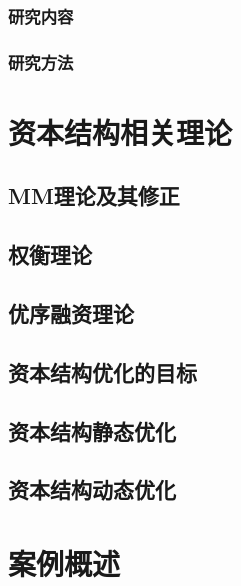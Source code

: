 \subsection{研究内容}
\subsection{研究方法}
\cite{Brusov2023}
\cite{Cao2018}
\cite{Chen2022}
\cite{Dai2022}
\cite{Dong2019}
\cite{Du2016}
\cite{Gu2022}
\cite{Hong2015}
\cite{Li2019}
\cite{Li2019a}
\cite{Li2021}
\cite{Li2023}
\cite{Liaqat2021}
\cite{Liu2017}
\cite{Liu2019}
\cite{Liu2022}
\cite{Liu2023}


\cite{Ma2022}
\cite{Mbulawa2020}
\cite{Meng2020}
\cite{Modigliani1958}
\cite{Shen2022}
\cite{Song2021}
\cite{Spitsin2020}
\cite{Su2022}
\cite{Sun2020}
\cite{Wan2022}
\cite{Wang2008}
\cite{Wang2021}
\cite{Wangchen2022}
\cite{Xiong2022}
\cite{Xu2022}
\cite{Xu2022a}
\cite{Yang2014}
\cite{Yang2020}
\cite{Yao2022}
\cite{Yu2017}
\cite{Zhang2014}
\cite{Zhang2022}
\cite{Zhang2022a}
\cite{Zhu2022}
\cite{Zhu2023}
\cite{Zuo2020}
\chapter{资本结构相关理论}

\section{MM理论及其修正}
\section{权衡理论}
\section{优序融资理论}
\section{资本结构优化的目标}
\section{资本结构静态优化}
\section{资本结构动态优化}


\chapter{案例概述}

